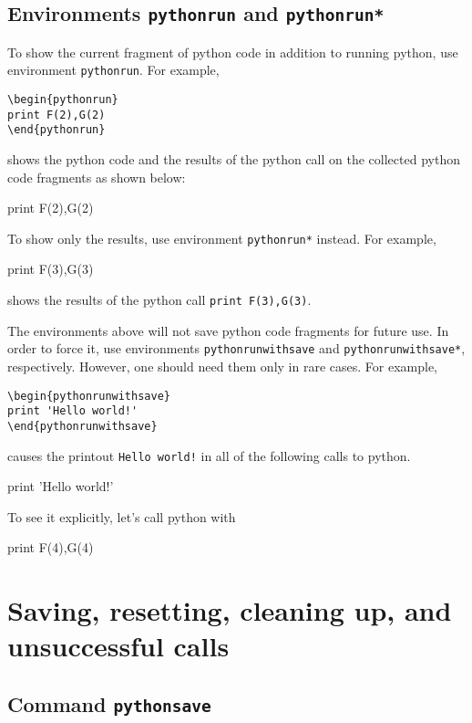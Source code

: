 \documentclass[a4paper,12pt]{article}
\newcommand{\bs}{\symbol{`\\}}
\begin{document}
\subsection{Environments \texttt{pythonrun} and \texttt{pythonrun*}}

To show the current fragment of python code in addition to running
python, use environment 
\verb+pythonrun+. For example,
\begin{verbatim}
\begin{pythonrun}
print F(2),G(2)
\end{pythonrun}
\end{verbatim}
shows the python code and the results of the python call on the collected
python code fragments as shown below:
\begin{pythonrun}
print F(2),G(2)
\end{pythonrun}

To show only the results, use environment \verb+pythonrun*+ instead. For
example,
\begin{pythonrun*}
print F(3),G(3)
\end{pythonrun*}
shows the results of the python call \verb+print F(3),G(3)+.

The environments above will not save python code fragments for future
use. In order to force it, use environments \verb+pythonrunwithsave+
and \verb+pythonrunwithsave*+, respectively. However, one should need
them only in rare cases. For example,
\begin{verbatim}
\begin{pythonrunwithsave}
print 'Hello world!'
\end{pythonrunwithsave}
\end{verbatim}
causes the printout \verb+Hello world!+ in all of the following calls
to python.
\begin{pythonrunwithsave}
print 'Hello world!'
\end{pythonrunwithsave}
To see it explicitly, let's call python with
\begin{pythonrun}
print F(4),G(4)
\end{pythonrun}


\section{Saving, resetting, cleaning up, and unsuccessful calls}

\subsection{Command \texttt{\bs pythonsave}}
\end{document}

